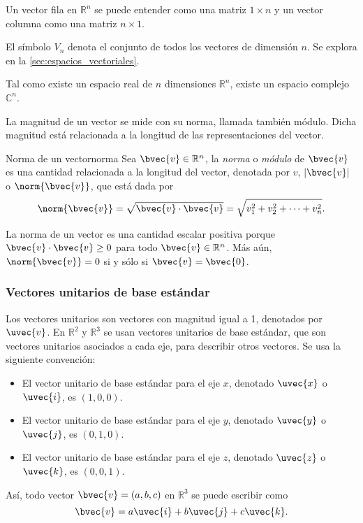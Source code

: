 \documentclass{fmbnotes}
\begin{document}
Un vector fila en \(\mathbb{R}^{n}\) se puede entender como una matriz \(1 \times n \) y un vector columna como una matriz \(n \times 1\). 

El símbolo \(V_n\) denota el conjunto de todos los vectores de dimensión \( n \). Se explora en la \autoref{sec:espacios_vectoriales}.

\begin{advertencia}
	Tal como existe un espacio real de \(n\) dimensiones \( \mathbb{R}^{n} \), existe un espacio complejo \(\mathbb{C}^{n}\).
\end{advertencia}

La magnitud de un vector se mide con su norma, llamada también módulo. Dicha magnitud está relacionada a la longitud de las representaciones del vector. 

\begin{definicion}{Norma de un vector}{norma}
Sea \(\bvec{v} \in \mathbb{R}^{n}\), la \emph{norma} o \emph{módulo} de \(\bvec{v}\) es una cantidad relacionada a la longitud del vector, denotada por \(v\), \(\left|\bvec{v}\right|\) o \(\norm{\bvec{v}}\), que está dada por
\[\norm{\bvec{v}}=\sqrt{\bvec{v}\cdot\bvec{v}}=\sqrt{v_1^2+v_2^2+\cdots+v_n^2}.\]
\end{definicion}

La norma de un vector es una cantidad escalar positiva porque \(\bvec{v}\cdot\bvec{v}\geq0\) para todo \(\bvec{v}\in\mathbb{R}^{n}\). Más aún, \(\norm{\bvec{v}}=0\) si y sólo si \(\bvec{v}=\bvec{0}\). 

\subsubsection{Vectores unitarios de base estándar}
Los vectores unitarios son vectores  con magnitud igual a 1, denotados por \(\uvec{v}\). En \( \mathbb{R}^{2} \) y \( \mathbb{R}^{3} \) se usan vectores unitarios de base estándar, que son vectores unitarios asociados a cada eje, para describir otros vectores. Se usa la siguiente convención:
\begin{itemize}
\item El vector unitario de base estándar para el eje \( x \), denotado \( \uvec{x} \) o \( \uvec{i} \), es \((1,0,0)\).
\item El vector unitario de base estándar para el eje \( y \), denotado \( \uvec{y} \) o \( \uvec{j} \), es \((0,1,0)\).
\item El vector unitario de base estándar para el eje \( z \), denotado \( \uvec{z} \) o \( \uvec{k} \), es \((0,0,1)\).
\end{itemize}
Así, todo vector \(\bvec{v}=(a,b,c)\) en \(\mathbb{R}^{3}\) se puede escribir como
\[ \bvec{v}=a\uvec{i}+b\uvec{j}+c\uvec{k}.\]
\end{document}
